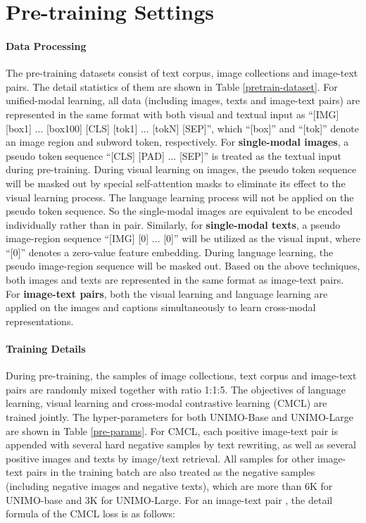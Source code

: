 \documentclass[11pt,a4paper]{article}
\begin{document}
\section{Pre-training Settings}
\label{sec:pretrain}

\paragraph{Data Processing}
The pre-training datasets consist of text corpus, image collections and image-text pairs.
The detail statistics of them are shown in Table \ref{pretrain-dataset}. 
For unified-modal learning, all data (including images, texts and image-text pairs) are represented in the same format with both visual and textual input as ``[IMG] [box1] ... [box100] [CLS] [tok1] ... [tokN] [SEP]'', which ``[box]'' and ``[tok]'' denote an image region and subword token, respectively.
For \textbf{single-modal images}, a pseudo token sequence ``[CLS] [PAD] ... [SEP]'' is treated as the textual input during pre-training.
During visual learning on images, the pseudo token sequence will be masked out by special self-attention masks to eliminate its effect to the visual learning process.
The language learning process will not be applied on the pseudo token sequence.
So the single-modal images are equivalent to be encoded individually rather than in pair.
Similarly, for \textbf{single-modal texts}, a pseudo image-region sequence ``[IMG] [0] ... [0]'' will be utilized as the visual input, where ``[0]'' denotes a zero-value feature embedding.
During language learning, the pseudo image-region sequence will be masked out.
Based on the above techniques, both images and texts are represented in the same format as image-text pairs.
For \textbf{image-text pairs}, both the visual learning and language learning are applied on the images and captions simultaneously to learn cross-modal representations. 

\paragraph{Training Details} During pre-training, the samples of image collections, text corpus and image-text pairs are randomly mixed together with ratio 1:1:5. The objectives of language learning, visual learning and cross-modal contrastive learning (CMCL) are trained jointly.
The hyper-parameters for both UNIMO-Base and UNIMO-Large are shown in Table \ref{pre-params}.
For CMCL, each positive image-text pair is appended with several hard negative samples by text rewriting, as well as several positive images and texts by image/text retrieval.
All samples for other image-text pairs in the training batch are also treated as the negative samples (including negative images and negative texts), which are more than 6K for UNIMO-base and 3K for UNIMO-Large.
For an image-text pair , the detail formula of the CMCL loss  is as follows:
\end{document}

